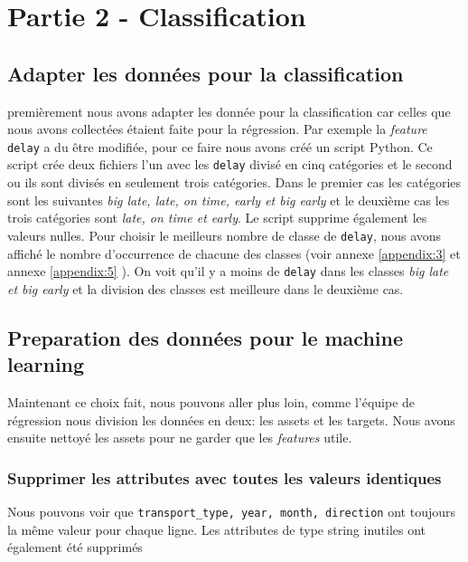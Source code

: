 \section{Partie 2 - Classification}
\subsection{Adapter les données pour la classification}
premièrement nous avons adapter les donnée pour la classification car celles que nous avons collectées étaient faite pour la régression. Par exemple la \textit{feature} \lstinline!delay! a du être modifiée, pour ce faire nous avons créé un script Python. Ce script crée deux fichiers l'un avec les \lstinline!delay! divisé en cinq catégories et le second ou ils sont divisés en seulement trois catégories. Dans le premier cas les catégories sont les suivantes \textit{big late, late, on time, early et big early} et le deuxième cas les trois catégories sont \textit{late, on time et early}. Le script supprime également les valeurs nulles. Pour choisir le meilleurs nombre de classe de \lstinline!delay!, nous avons affiché le nombre d'occurrence de chacune des classes (voir annexe \ref{appendix:3} et annexe \ref{appendix:5} ). On voit qu'il y a moins de \lstinline!delay! dans les classes \textit{big late et big early} et la division des classes est meilleure dans le deuxième cas.


\subsection{Preparation des données pour le machine learning}
Maintenant ce choix fait, nous pouvons aller plus loin, comme l'équipe de régression nous division les données en deux: les assets et les targets. Nous avons ensuite nettoyé les assets pour ne garder que les \textit{features} utile.

\subsubsection{Supprimer les attributes avec toutes les valeurs identiques}


Nous pouvons voir que \lstinline!transport_type, year, month, direction! ont toujours la même valeur pour chaque ligne. Les attributes de type string inutiles ont également été supprimés


